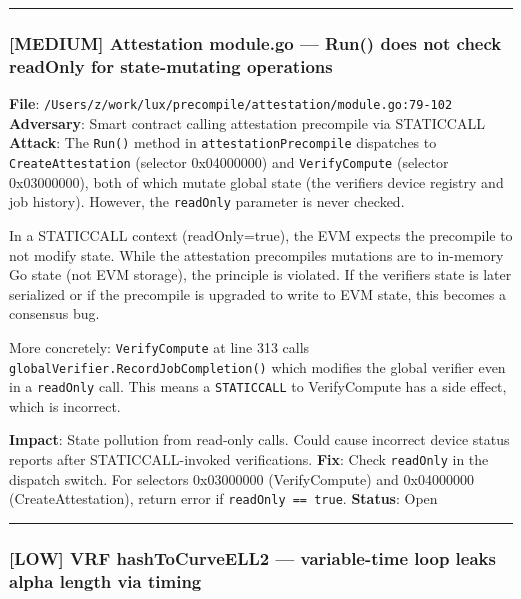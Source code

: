 \documentclass[
]{article}
\begin{document}
\begin{center}\rule{0.5\linewidth}{0.5pt}\end{center}

\subsubsection{{[}MEDIUM{]} Attestation module.go --- Run() does not
check readOnly for state-mutating
operations}\label{medium-attestation-modulego--run-does-not-check-readonly-for-state-mutating-operations}

\textbf{File}:
\texttt{/Users/z/work/lux/precompile/attestation/module.go:79-102}
\textbf{Adversary}: Smart contract calling attestation precompile via
STATICCALL \textbf{Attack}: The \texttt{Run()} method in
\texttt{attestationPrecompile} dispatches to \texttt{CreateAttestation}
(selector 0x04000000) and \texttt{VerifyCompute} (selector 0x03000000),
both of which mutate global state (the verifier\textquotesingle s device
registry and job history). However, the \texttt{readOnly} parameter is
never checked.

In a STATICCALL context (readOnly=true), the EVM expects the precompile
to not modify state. While the attestation precompile\textquotesingle s
mutations are to in-memory Go state (not EVM storage), the principle is
violated. If the verifier\textquotesingle s state is later serialized or
if the precompile is upgraded to write to EVM state, this becomes a
consensus bug.

More concretely: \texttt{VerifyCompute} at line 313 calls
\texttt{globalVerifier.RecordJobCompletion()} which modifies the global
verifier even in a \texttt{readOnly} call. This means a
\texttt{STATICCALL} to VerifyCompute has a side effect, which is
incorrect.

\textbf{Impact}: State pollution from read-only calls. Could cause
incorrect device status reports after STATICCALL-invoked verifications.
\textbf{Fix}: Check \texttt{readOnly} in the dispatch switch. For
selectors 0x03000000 (VerifyCompute) and 0x04000000 (CreateAttestation),
return error if \texttt{readOnly\ ==\ true}. \textbf{Status}: Open

\begin{center}\rule{0.5\linewidth}{0.5pt}\end{center}

\subsubsection{{[}LOW{]} VRF hashToCurveELL2 --- variable-time loop
leaks alpha length via
timing}\label{low-vrf-hashtocurveell2--variable-time-loop-leaks-alpha-length-via-timing}
\end{document}
